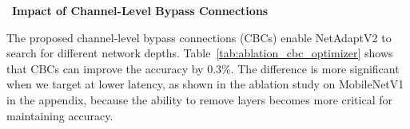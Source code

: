 \begin{table}[t]
\centering
{}
\caption{The ablation study of the proposed ordered dropout (OD) on MobileNetV1~\cite{Howard2017MobileNetV1} and ImageNet. The numbers between parentheses show the breakdown of the search time in terms of training a super-network, training and evaluating samples, and training the discovered DNN from left to right.}
\label{tab:ablation_ordered_dropout}
\end{table}

\noindent \textbullet\ \textbf{Impact of Channel-Level Bypass Connections}

The proposed channel-level bypass connections (CBCs) enable NetAdaptV2 to search for different network depths. Table~\ref{tab:ablation_cbc_optimizer} shows that CBCs can improve the accuracy by 0.3\%. The difference is more significant when we target at lower latency, as shown in the ablation study on MobileNetV1 in the appendix, because the ability to remove layers becomes more critical for maintaining accuracy.

